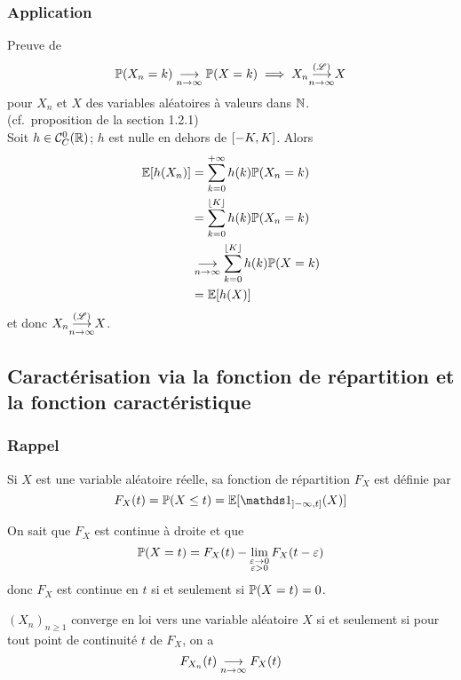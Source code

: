 \subsubsection*{Application} Preuve de
\begin{equation*}
    \mathbb{P}(X_n=k)\underset{n\to\infty}{\longrightarrow} \mathbb{P}(X=k) \implies X_n\underset{n\to\infty}{{\overset{(\mathscr{L})}{\longrightarrow}}} X
\end{equation*}
pour \(X_n\) et \(X\) des variables aléatoires à valeurs dans \(\mathbb{N}\).\\
(cf.\ proposition de la section 1.2.1)\\
Soit \(h\in \mathcal C_C^0(\mathbb{R})\); \(h\) est nulle en dehors de \(\mathopen{}\left[-K,K\right]\mathclose{}\). Alors
\begin{equation*}
    \begin{aligned}
        \mathbb{E}[h(X_n)]
        &= \sum_{k=0}^{+\infty} h(k) \mathbb{P}(X_n=k)\\
        &= \sum_{k=0}^{\lfloor K\rfloor} h(k) \mathbb{P}(X_n=k)\\
        &\underset{n\to\infty}{\longrightarrow} \sum_{k=0}^{\lfloor K\rfloor} h(k) \mathbb{P}(X=k)\\
        &= \mathbb{E}[h(X)]
    \end{aligned}
\end{equation*}
et donc \(X_n\underset{n\to\infty}{{\overset{(\mathscr{L})}{\longrightarrow}}} X\).

\subsection{Caractérisation via la fonction de répartition et la fonction caractéristique}

\subsubsection*{Rappel}
Si \(X\) est une variable aléatoire réelle, sa fonction de répartition \(F_X\)
est définie par
\begin{equation*}
    F_X(t) = \bb P(X\leq t) = \bb E[\one_{\of{-\infty,t}}(X)]
\end{equation*}

On sait que \(F_X\) est continue à droite et que
\begin{equation*}
    \mathbb{P}(X=t) = F_X(t) - \lim\limits_{\substack{\varepsilon\to 0\\ \varepsilon>0}} F_X(t-\varepsilon)
\end{equation*}
donc \(F_X\) est continue en \(t\) si et seulement si \(\mathbb{P}(X=t) = 0\).

\begin{proposition}
    \({(X_n)}_{n\geq 1}\) converge en loi vers une variable aléatoire \(X\)
    si et seulement si pour tout point de continuité \(t\) de \(F_X\), on a
    \begin{equation*}
        F_{X_n}(t) \underset{n\to\infty}{\longrightarrow} F_X(t)
    \end{equation*}
\end{proposition}

